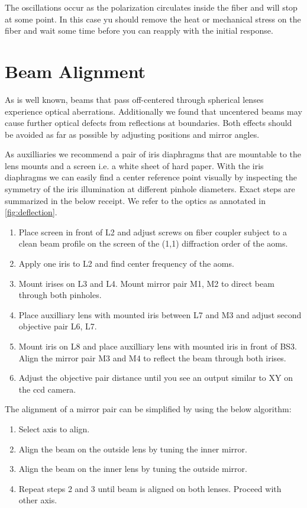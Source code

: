 The oscillations occur as the polarization circulates inside the fiber and
will stop at some point. In this case yu should remove the heat or mechanical 
stress on the fiber and wait some time before you can reapply with the initial
response.

\section{Beam Alignment}

As is well known, beams that pass off-centered through spherical lenses
experience optical aberrations. Additionally we found that uncentered beams
may cause further optical defects from reflections at boundaries. Both effects
should be avoided as far as possible by adjusting positions and mirror angles.

As auxilliaries we recommend a pair of iris diaphragms that are mountable to
the lens mounts and a screen i.e. a white sheet of hard paper. With the iris
diaphragms we can easily find a center reference point visually by inspecting
the symmetry of the iris illumination at different pinhole diameters. Exact
steps are summarized in the below receipt. We refer to the optics as annotated
in \cref{fig:deflection}.

\begin{enumerate}
  \item Place screen in front of L2 and adjust screws on fiber coupler subject
    to a clean beam profile on the screen of the (1,1) diffraction order of
    the \gls{aom}s.
  \item Apply one iris to L2 and find center frequency of the \gls{aom}s.
  \item Mount irises on L3 and L4. Mount mirror pair M1, M2 to direct beam
    through both pinholes.
  \item Place auxilliary lens with mounted iris between L7 and M3 and adjust
    second objective pair L6, L7.
  \item Mount iris on L8 and place auxilliary lens with mounted iris in front
    of BS3. Align the mirror pair M3 and M4 to reflect the beam through both
    irises.
  \item Adjust the objective pair distance until you see an output similar to
    XY on the \gls{ccd} camera.
\end{enumerate}

The alignment of a mirror pair can be simplified by using the below algorithm:

\begin{enumerate}
  \item Select axis to align.
  \item Align the beam on the outside lens by tuning the inner mirror.
  \item Align the beam on the inner lens by tuning the outside mirror.
  \item Repeat steps 2 and 3 until beam is aligned on both lenses. Proceed
    with other axis.
\end{enumerate}

